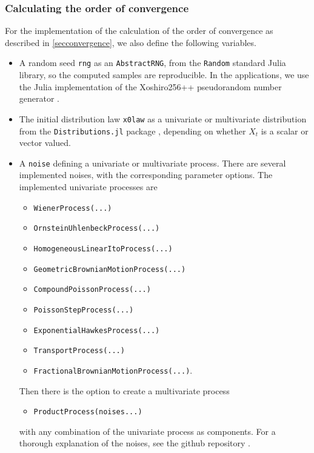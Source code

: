 \documentclass[reqno,12pt]{amsart}
\theoremstyle{plain} %
\theoremstyle{definition} %
\begin{document}
\subsubsection{Calculating the order of convergence}

For the implementation of the calculation of the order of convergence as described in \cref{secconvergence}, we also define the following variables.
\begin{itemize}
    \item A random seed \texttt{rng} as an \texttt{AbstractRNG}, from the \texttt{Random} standard Julia library, so the computed samples are reproducible. In the applications, we use the  Julia implementation of the Xoshiro256++ pseudorandom number generator \cite{BlackmanVigna2021}.
    \item The initial distribution law \texttt{x0law} as a univariate or multivariate distribution from the \texttt{Distributions.jl} package \cite{JSSv098i16}, depending on whether $X_t$ is a scalar or vector valued.
    \item A \texttt{noise} defining a univariate or multivariate process. There are several implemented noises, with the corresponding parameter options. The implemented univariate processes are 
    \begin{itemize}
        \item \texttt{WienerProcess(...)}
        \item \texttt{OrnsteinUhlenbeckProcess(...)}
        \item \texttt{HomogeneousLinearItoProcess(...)}
        \item \texttt{GeometricBrownianMotionProcess(...)}
        \item \texttt{CompoundPoissonProcess(...)}
        \item \texttt{PoissonStepProcess(...)}
        \item \texttt{ExponentialHawkesProcess(...)}
        \item \texttt{TransportProcess(...)}
        \item \texttt{FractionalBrownianMotionProcess(...)}.
    \end{itemize}
    Then there is the option to create a multivariate process
    \begin{itemize}
        \item \texttt{ProductProcess(noises...)}
    \end{itemize}
    with any combination of the univariate process as components. For a thorough explanation of the noises, see the github repository \cite{RODEConvEM2023}.

\end{itemize}
\end{document}
